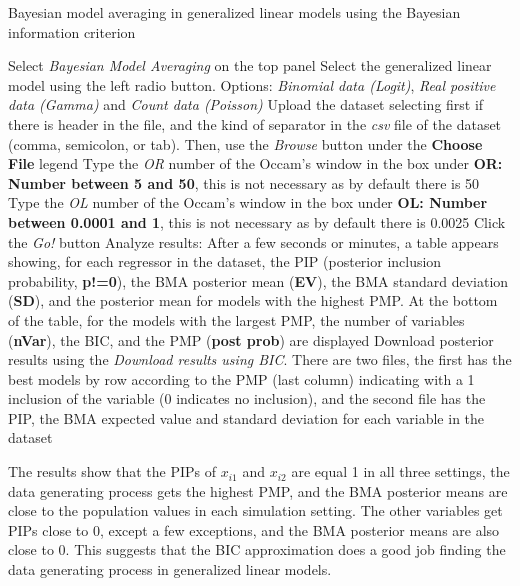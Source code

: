 \begin{algorithm}[h!]
	\caption{Bayesian model averaging in generalized linear models using the Bayesian information criterion}\label{alg:BMABIC}
	\begin{algorithmic}[1]  		 			
		\State Select \textit{Bayesian Model Averaging} on the top panel
		\State Select the generalized linear model using the left radio button. Options: \textit{Binomial data (Logit)}, \textit{Real positive data (Gamma)} and \textit{Count data (Poisson)}
		\State Upload the dataset selecting first if there is header in the file, and the kind of separator in the \textit{csv} file of the dataset (comma, semicolon, or tab). Then, use the \textit{Browse} button under the \textbf{Choose File} legend
		\State Type the \textit{OR} number of the Occam's window in the box under \textbf{OR: Number between 5 and 50}, this is not necessary as by default there is 50
		\State Type the \textit{OL} number of the Occam's window in the box under \textbf{OL: Number between 0.0001 and 1}, this is not necessary as by default there is 0.0025
		\State Click the \textit{Go!} button
		\State Analyze results: After a few seconds or minutes, a table appears showing, for each regressor in the dataset, the PIP (posterior inclusion probability, \textbf{p!=0}), the BMA posterior mean (\textbf{EV}), the BMA standard deviation (\textbf{SD}), and the posterior mean for models with the highest PMP. At the bottom of the table, for the models with the largest PMP, the number of variables (\textbf{nVar}), the BIC, and the PMP (\textbf{post prob}) are displayed
		\State Download posterior results using the \textit{Download results using BIC}. There are two files, the first has the best models by row according to the PMP (last column) indicating with a 1 inclusion of the variable (0 indicates no inclusion), and the second file has the PIP, the BMA expected value and standard deviation for each variable in the dataset
	\end{algorithmic} 
\end{algorithm}

The results show that the PIPs of $x_{i1}$ and $x_{i2}$ are equal 1 in all three settings, the data generating process gets the highest PMP, and the BMA posterior means are close to the population values in each simulation setting. The other variables get PIPs close to 0, except a few exceptions, and the BMA posterior means are also close to 0. This suggests that the BIC approximation does a good job finding the data generating process in generalized linear models.
 
